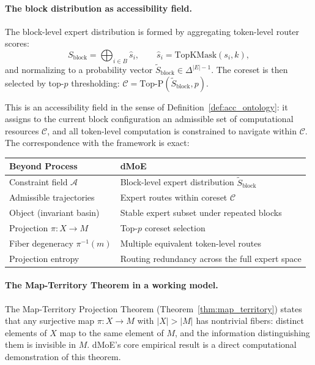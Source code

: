 \documentclass[12pt, a4paper, twoside]{article}
\theoremstyle{plain}
\theoremstyle{definition}
\theoremstyle{remark}
\begin{document}
\paragraph{The block distribution as accessibility field.}
The block-level expert distribution is formed by aggregating token-level
router scores:
\[
  S_{\mathrm{block}} = \bigoplus_{i \in B} \hat{s}_i, \qquad
  \hat{s}_i = \mathrm{TopKMask}(s_i, k),
\]
and normalizing to a probability vector $\widetilde{S}_{\mathrm{block}} \in
\Delta^{|E|-1}$. The coreset is then selected by top-$p$ thresholding:
$\mathcal{C} = \mathrm{Top\text{-}P}(\widetilde{S}_{\mathrm{block}}, p)$.

This is an accessibility field in the sense of Definition~\ref{def:acc_ontology}:
it assigns to the current block configuration an admissible set of
computational resources $\mathcal{C}$, and all token-level computation is
constrained to navigate within $\mathcal{C}$. The correspondence with the
framework is exact:

\begin{center}
\renewcommand{\arraystretch}{1.35}
\begin{tabular}{@{}ll@{}}
\toprule
\textbf{Beyond Process} & \textbf{dMoE} \\
\midrule
Constraint field $\mathcal{A}$ & Block-level expert distribution $\widetilde{S}_{\mathrm{block}}$ \\
Admissible trajectories & Expert routes within coreset $\mathcal{C}$ \\
Object (invariant basin) & Stable expert subset under repeated blocks \\
Projection $\pi: X \to M$ & Top-$p$ coreset selection \\
Fiber degeneracy $\pi^{-1}(m)$ & Multiple equivalent token-level routes \\
Projection entropy & Routing redundancy across the full expert space \\
\bottomrule
\end{tabular}
\end{center}

\paragraph{The Map-Territory Theorem in a working model.}
The Map-Territory Projection Theorem (Theorem~\ref{thm:map_territory}) states
that any surjective map $\pi: X \to M$ with $|X| > |M|$ has nontrivial
fibers: distinct elements of $X$ map to the same element of $M$, and the
information distinguishing them is invisible in $M$. dMoE's core empirical
result is a direct computational demonstration of this theorem.
\end{document}
